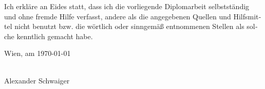 \begin{otherlanguage}{german}
\thispagestyle{empty}
\vspace*{2cm}

Ich erkläre an Eides statt, dass ich die vorliegende Diplomarbeit selbstständig und ohne fremde Hilfe verfasst, andere als die angegebenen Quellen und Hilfsmittel nicht benutzt bzw. die wörtlich oder sinngemäß entnommenen Stellen als solche kenntlich gemacht habe.

\vspace*{3cm}

\noindent
Wien, am {\today} %
%
\hfill 
%
\begin{minipage}[t]{5cm}
	\centering
\underline{\hspace*{5cm}}\\
\small {Alexander Schwaiger}
\end{minipage}
\end{otherlanguage}